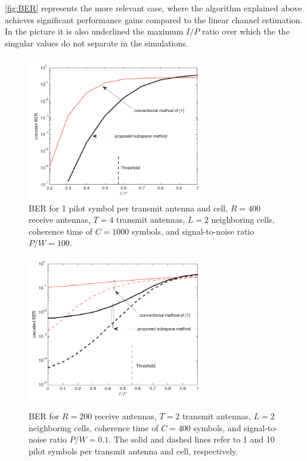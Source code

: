 \documentclass[11pt]{book}
\begin{document}
\autoref{fig:BER} represents the more relevant case, where the algorithm explained above achieves significant performance gains compared to the linear channel estimation. In the picture it is also underlined the maximum $I/P$ ratio over which the the singular values do not separate in the simulations.

\begin{figure}
  \centering
  \includegraphics[width = 0.7\textwidth]{SNRvsMarzetta.png}
  \caption{\footnotesize{BER for 1 pilot symbol per transmit antenna and cell, $R = 400$
  receive antennas, $T = 4$ transmit antennas, $L = 2$ neighboring cells, coherence time  of $C = 1000$ symbols, and signal-to-noise ratio $P/W = 100$.}}
  \label{fig:SNR}
\end{figure}
\begin{figure}
  \centering
  \includegraphics[width = 0.7\textwidth]{BERvsMarzetta.png}
  \label{fig:BER}
  \caption{\footnotesize{BER for $R = 200$ receive antennas, $T = 2$ transmit antennas, $L = 2$ neighboring cells, coherence time of $C = 400$ symbols, and signal-to-noise ratio $P/W = 0.1$. The solid and dashed lines refer to 1 and 10 pilot symbols per transmit antenna and cell, respectively.}}
\end{figure}
\end{document}
